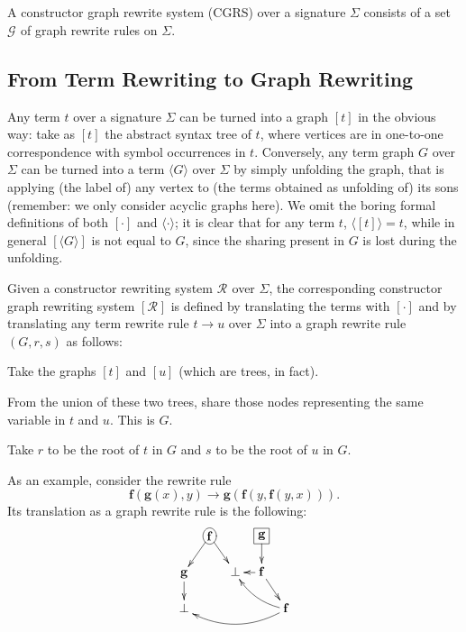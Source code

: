 \documentclass{LMCS}
\newcommand{\funone}{\mathbf{f}}
\newcommand{\funtwo}{\mathbf{g}}
\newcommand{\varone}{x}
\newcommand{\vartwo}{y}
\newcommand{\termone}{t}
\newcommand{\termtwo}{u}
\newcommand{\sigone}{\Sigma}
\newcommand{\rootone}{r}
\newcommand{\roottwo}{s}
\newcommand{\tgone}{G}
\newcommand{\Rules}[1]{\mathcal{R}_{#1}}
\newcommand{\Graphs}[1]{\mathcal{G}_{#1}}
\newcommand{\CtoCG}[1]{[#1]}
\newcommand{\CGtoC}[1]{\langle #1\rangle}
\newcommand{\srrone}{\Rules{}}
\newcommand{\sgrone}{\Graphs{}}
\newcommand{\rewrTRS}{\rightarrow}
\newenvironment{varitemize}
{
\begin{list}{\labelitemi}
{\setlength{\itemsep}{0.0mm}
 \setlength{\topsep}{0.0mm}
 \setlength{\parindent}{0.0mm}
 \setlength{\parskip}{0.0mm}
 \setlength{\parsep}{0.0mm}
 \setlength{\partopsep}{0.0mm}
 \setlength{\leftmargin}{15pt}
 \setlength{\labelsep}{5pt}
 \setlength{\labelwidth}{10pt}}}
{
 \end{list} 
}
\begin{document}
\begin{defi}
A constructor graph rewrite system (CGRS) over a signature $\sigone$ consists of
a set $\sgrone$ of graph rewrite rules  on $\sigone$.
\end{defi}
\subsection{From Term Rewriting to Graph Rewriting}\label{Sect-TRtoGR}
Any term $\termone$ over a signature $\sigone$ can be turned into a
graph $\CtoCG{\termone}$ in the obvious way: take as $\CtoCG{\termone}$ the abstract
syntax tree of $\termone$, where vertices are in one-to-one correspondence
with symbol occurrences in $\termone$. Conversely, any term graph
$\tgone$ over $\sigone$ can be turned into a term $\CGtoC{\tgone}$
over $\sigone$ by simply unfolding the graph, that is applying (the label of) any vertex
to (the terms obtained as unfolding of) its sons (remember: we only consider acyclic graphs here).
We omit the boring formal definitions of both $\CtoCG{\cdot}$ and $\CGtoC{\cdot}$; it is clear that 
for any term $\termone$, $\CGtoC{\CtoCG{\termone}}=\termone$, while in general 
$\CtoCG{\CGtoC{\tgone}}$ is not equal to $\tgone$, since the sharing present in $\tgone$ is lost during the unfolding. 

\begin{defi}
Given a constructor rewriting system $\srrone$ over $\sigone$, the 
corresponding constructor graph rewriting system $\CtoCG{\srrone}$ is defined 
by translating the terms with $\CtoCG{\cdot}$ and by translating any term 
rewrite rule $\termone\rewrTRS\termtwo$ 
over $\sigone$ into a graph rewrite rule $(\tgone,\rootone,\roottwo)$
as follows:
\begin{varitemize}
\item
  Take the graphs $\CtoCG{\termone}$ and $\CtoCG{\termtwo}$ (which are
  trees, in fact). 
\item
  From the union of these two trees, share those
  nodes representing the same variable in $\termone$ and $\termtwo$.
  This is $\tgone$.
\item
  Take $\rootone$ to be the root of $\termone$ in $\tgone$ and
  $\roottwo$ to be the root of $\termtwo$ in $\tgone$.
\end{varitemize}
\end{defi}

As an example, consider the rewrite rule
$$
\funone(\funtwo(\varone),\vartwo)\rewrTRS \funtwo(\funone(\vartwo,\funone(\vartwo,\varone))).
$$
Its translation as a graph rewrite rule is the following:
\begin{displaymath}
\xymatrix@R=15pt@C=8pt{
 & *+[o][F]{\funone}\ar[dl]\ar[dr] & & *+[F]{\funtwo}\ar[d] & \\
 \funtwo\ar[d] & & \bot & \funone\ar[l]\ar[dr] & \\
 \bot & & & & \funone\ar@/^/[ull]\ar@/^1pc/[llll]
}\vspace{12 pt}
\end{displaymath}
\end{document}
